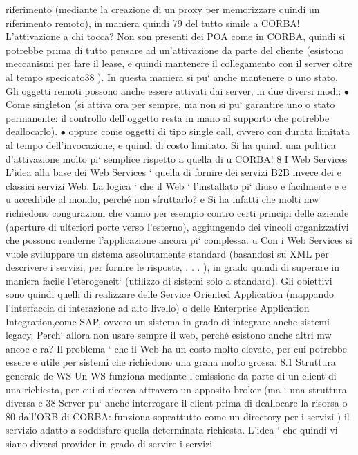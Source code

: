 \documentclass[a4paper,12pt]{article}
\begin{document}
riferimento (mediante la creazione
di un proxy per memorizzare quindi un riferimento remoto), in maniera quindi
79
del tutto simile a CORBA!
L'attivazione a chi tocca? Non son presenti dei POA come in CORBA,
quindi si potrebbe prima di tutto pensare ad un'attivazione da parte del cliente
(esistono meccanismi per fare il lease, e quindi mantenere il collegamento con il
server oltre al tempo specicato38 ). In questa maniera si pu` anche mantenere
o
uno stato.
Gli oggetti remoti possono anche essere attivati dai server, in due diversi
modi:
$\bullet$ Come singleton (si attiva ora per sempre, ma non si pu` garantire uno
o
stato permanente: il controllo dell'oggetto resta in mano al supporto che
potrebbe deallocarlo).
$\bullet$ oppure come oggetti di tipo single call, ovvero con durata limitata al tempo
dell'invocazione, e quindi di costo limitato.
Si ha quindi una politica d'attivazione molto pi` semplice rispetto a quella di
u
CORBA!
8
I Web Services
L'idea alla base dei Web Services ` quella di fornire dei servizi B2B invece dei
e
classici servizi Web. La logica ` che il Web ` l'installato pi` diuso e facilmente
e
e
u
accedibile al mondo, perché non sfruttarlo?
e
Si ha infatti che molti mw richiedono congurazioni che vanno per esempio
contro certi principi delle aziende (aperture di ulteriori porte verso l'esterno),
aggiungendo dei vincoli organizzativi che possono renderne l'applicazione ancora
pi` complessa.
u
Con i Web Services si vuole sviluppare un sistema assolutamente standard
(basandosi su XML per descrivere i servizi, per fornire le risposte, . . . ), in grado quindi di superare in maniera
facile l'eterogeneit` (utilizzo di sistemi solo
a
standard). Gli obiettivi sono quindi quelli di realizzare delle Service Oriented
Application (mappando l'interfaccia di interazione ad alto livello) o delle Enterprise Application Integration,come SAP,
ovvero un sistema in grado di integrare
anche sistemi legacy.
Perch` allora non usare sempre il web, perché esistono anche altri mw ancoe
e
ra? Il problema ` che il Web ha un costo molto elevato, per cui potrebbe essere
e
utile per sistemi che richiedono una grana molto grossa.
8.1
Struttura generale de WS
Un WS funziona mediante l'emissione da parte di un client di una richiesta,
per cui si ricerca attravero un apposito broker (ma ` una struttura diversa
e
38 Server
pu` anche interrogare il client prima di deallocare la risorsa
o
80
dall'ORB di CORBA: funziona soprattutto come un directory per i servizi ) il
servizio adatto a soddisfare quella determinata richiesta.
L'idea ` che quindi vi siano diversi provider in grado di servire i servizi
\end{document}
